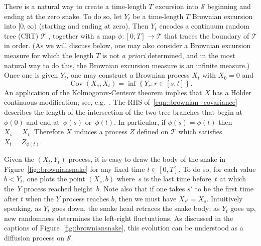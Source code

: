 \documentclass[JEP,XML,SOM,Unicode]{cedram}
\let\mathcal\mathscr
\let\oldS\S
\theoremstyle{plain}
\numberwithin{theorem}{section}
\theoremstyle{definition}
\newcommand{\CT}{{\mathcal T}}\let\treespace\CT
\newcommand{\snake}{{\mathcal S}}
\renewcommand{\S}{{\mathbf S}}
\DeclareMathOperator{\Cov}{Cov}
\begin{document}
There is a natural way to create a time-length $T$ excursion into $\snake$ beginning and ending at the zero snake. To do so, let $Y_t$ be a time-length $T$ Brownian excursion into $[0, \infty)$ (starting and ending at zero). Then $Y_t$ encodes a continuum random tree (CRT) $\mathcal T$ \cite{ald1991crt1,ald1991crt2,ald1993crt3}, together with a map $\phi\colon [0,T] \to \mathcal T$ that traces the boundary of $\CT$ in order. (As we will discuss below, one may also consider a Brownian excursion measure for which the length $T$ is not \emph{a priori} determined, and in the most natural way to do this, the Brownian excursion measure is an infinite measure.) Once one is given $Y_t$, one may construct a Brownian process $X_t$ with $X_0 = 0$ and
\begin{equation}
\label{eqn::brownian_covariance}
\Cov(X_s, X_t) = \inf \left\{Y_r: r \in [s,t] \right\}.
\end{equation}
An application of the Kolmogorov-Centsov theorem implies that $X$ has a Hölder continuous modification; see, e.g.\ \cite[\oldS 3.4]{legall2014icm}. The RHS of~\eqref{eqn::brownian_covariance} describes the length of the intersection of the two tree branches that begin at~$\phi(0)$ and end at~$\phi(s)$ or~$\phi(t)$. In particular, if $\phi(s) = \phi(t)$ then $X_s = X_t$. Therefore $X$ induces a process $Z$ defined on $\CT$ which satisfies $X_t = Z_{\phi(t)}$.

Given the $(X_t, Y_t)$ process, it is easy to draw the body of the snake in Figure~\ref{fig::browniansnake} for any fixed time $t \in [0,T]$. To do so, for each value $b < Y_t$, one plots the point $(X_s, b)$ where~$s$ is the last time before~$t$ at which the~$Y$ process reached height~$b$. Note also that if one takes $s'$ to be the first time after $t$ when the $Y$ process reaches $b$, then we must have $X_{s'} = X_s$. Intuitively speaking, as $Y_t$ goes down, the snake head retraces the snake body; as $Y_t$ goes up, new randomness determines the left-right fluctuations. As discussed in the captions of Figure~\ref{fig::browniansnake}, this evolution can be understood as a diffusion process on $\snake$.
\end{document}
